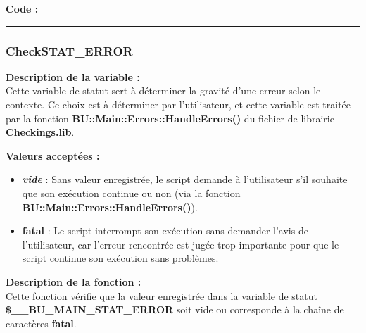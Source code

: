 \documentclass[a4paper,10pt]{article}
\begin{document}
\begin{justify}
    \textbf{Code :}
\end{justify}



\color{blue}\par\noindent\rule{\textwidth}{0.4pt}\color{white}

\color{blue}
\subsubsection{CheckSTAT\_ERROR}\color{white}

\begin{justify}
    \textbf{Description de la variable :}\\
    Cette variable de statut sert à déterminer la gravité d'une erreur selon le contexte. Ce choix est à déterminer par l'utilisateur, et cette variable est traitée par la fonction \textbf{\color{mauve}BU::Main::Errors::HandleErrors()} du fichier de librairie \textbf{\color{lime}Checkings.lib}.
\end{justify}

\begin{justify}
    \textbf{Valeurs acceptées :}

    \begin{itemize}
        \item \textbf{\textit{vide}} : Sans valeur enregistrée, le script demande à l'utilisateur s'il souhaite que son exécution
        continue ou non (via la fonction \textbf{\color{mauve}BU::Main::Errors::HandleErrors()}).\\

        \item \textbf{fatal} : Le script interrompt son exécution sans demander l'avis de l'utilisateur, car l'erreur rencontrée est jugée trop importante pour que le script continue son exécution sans problèmes.
    \end{itemize}
\end{justify}

\begin{justify}
    \textbf{Description de la fonction :}\\
        Cette fonction vérifie que la valeur enregistrée dans la variable de statut \textbf{\color{orange}\$\_\_BU\_MAIN\_STAT\_ERROR} soit vide ou corresponde à la chaîne de caractères \textbf{fatal}.
\end{justify}
\end{document}
